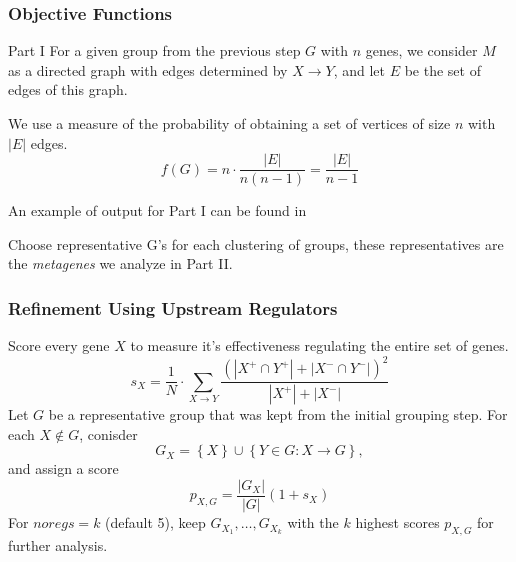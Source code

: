\documentclass[
	11pt, %
]{beamer}
\begin{document}
\begin{frame}
    \frametitle{Objective Functions}
    \begin{block}{Part I}
        For a given group from the previous step $G$ with $n$ genes, we consider $M$ as a directed graph with edges determined by $X \rightarrow Y$, and let $E$ be the set of edges of this graph.
        \smallskip
        
        \pause
        We use a measure of the probability of obtaining a set of vertices of size $n$ with $\left| E \right|$ edges.
        \begin{equation*}
            f(G) = n \cdot \frac{\left| E \right|}{n(n-1)}= \frac{\left| E \right|}{n-1}
        \end{equation*}
    \end{block}

    \pause
    \bigskip
    An example of output for Part I can be found in \cite[page 12]{p2}

    \pause
    \bigskip
    Choose representative G's for each clustering of groups, these representatives are the \emph{metagenes} we analyze in Part II.
\end{frame}

\begin{frame}
    \frametitle{Refinement Using Upstream Regulators}
    Score every gene $X$ to measure it's effectiveness regulating the entire set of genes.
    \begin{equation*}
        s_X = \frac{1}{N} \cdot \sum_{X \rightarrow Y}\frac{\left( \left| X^{+} \cap Y^{+}\right| + \left| X^{-} \cap Y^{-}\right| \right)^2}{\left| X^{+} \right| + \left| X^{-} \right|}
    \end{equation*}
    \pause
    Let $G$ be a representative group that was kept from the initial grouping step. For each $X \notin G$, conisder
    \begin{equation*}
        G_X = \left\{ X \right\} \cup \left\{ Y \in G : X \rightarrow G \right\},
    \end{equation*}
    \pause
    and assign a score
    \begin{equation*}
        p_{X,G}=\frac{\left| G_X \right|}{\left| G \right|}(1+s_X)
    \end{equation*}
    \pause
    For $noregs=k$ (default 5), keep $G_{X_1}, \ldots, G_{X_k}$ with the $k$ highest scores $p_{X,G}$ for further analysis.
\end{frame}
\end{document}
